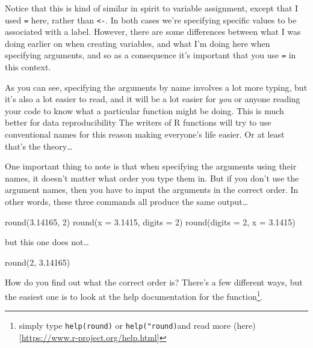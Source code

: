 \documentclass[
]{book}
\newenvironment{Shaded}{\begin{snugshade}}{\end{snugshade}}
\newcommand{\AttributeTok}[1]{\textcolor[rgb]{0.77,0.63,0.00}{#1}}
\newcommand{\DecValTok}[1]{\textcolor[rgb]{0.00,0.00,0.81}{#1}}
\newcommand{\FloatTok}[1]{\textcolor[rgb]{0.00,0.00,0.81}{#1}}
\newcommand{\FunctionTok}[1]{\textcolor[rgb]{0.00,0.00,0.00}{#1}}
\newcommand{\NormalTok}[1]{#1}
\begin{document}
Notice that this is kind of similar in spirit to variable assignment, except that I used \texttt{=} here, rather than \texttt{\textless{}-}. In both cases we're specifying specific values to be associated with a label. However, there are some differences between what I was doing earlier on when creating variables, and what I'm doing here when specifying arguments, and so as a consequence it's important that you use \texttt{=} in this context.

As you can see, specifying the arguments by name involves a lot more typing, but it's also a lot easier to read, and it will be a lot easier for \emph{you} or anyone reading your code to know what a particular function might be doing. This is much better for data reproducibility
The writers of R functions will try to use conventional names for this reason making everyone's life easier. Or at least that's the theory\ldots{}

One important thing to note is that when specifying the arguments using their names, it doesn't matter what order you type them in. But if you don't use the argument names, then you have to input the arguments in the correct order. In other words, these three commands all produce the same output\ldots{}

\begin{Shaded}
\begin{Highlighting}[]
\FunctionTok{round}\NormalTok{(}\FloatTok{3.14165}\NormalTok{, }\DecValTok{2}\NormalTok{)}
\FunctionTok{round}\NormalTok{(}\AttributeTok{x =} \FloatTok{3.1415}\NormalTok{, }\AttributeTok{digits =} \DecValTok{2}\NormalTok{)}
\FunctionTok{round}\NormalTok{(}\AttributeTok{digits =} \DecValTok{2}\NormalTok{, }\AttributeTok{x =} \FloatTok{3.1415}\NormalTok{)}
\end{Highlighting}
\end{Shaded}

but this one does not\ldots{}

\begin{Shaded}
\begin{Highlighting}[]
\FunctionTok{round}\NormalTok{(}\DecValTok{2}\NormalTok{, }\FloatTok{3.14165}\NormalTok{)}
\end{Highlighting}
\end{Shaded}

How do you find out what the correct order is? There's a few different ways, but the easiest one is to look at the help documentation for the function\footnote{ simply type \texttt{help(round)} or \texttt{help("round)}and read more (here){[}\url{https://www.r-project.org/help.html}{]}}.
\end{document}
